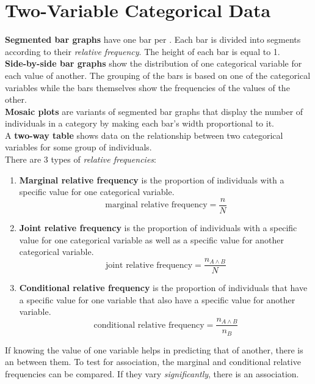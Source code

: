 \documentclass[../AP_Statistics.tex]{subfiles}
\begin{document}
	\chapter{Two-Variable Categorical Data}
		\textbf{Segmented bar graphs} have one bar per . Each bar is divided into segments according to their \emph{relative frequency}. The height of each bar is equal to 1. \\
		\textbf{Side-by-side bar graphs} show the distribution of one categorical variable for each value of another. The grouping of the bars is based on one of the categorical variables while the bars themselves show the frequencies of the values of the other. \\
		\textbf{Mosaic plots} are variants of segmented bar graphs that display the number of individuals in a category by making each bar's width proportional to it. \\
		A \textbf{two-way table} shows data on the relationship between two categorical variables for some group of individuals. \\
		There are 3 types of \emph{relative frequencies}:
		\begin{enumerate}
			\item \textbf{Marginal relative frequency} is the proportion of individuals with a specific value for one categorical variable.
				\[\text{marginal relative frequency} = \frac{n}{N}\]
			\item \textbf{Joint relative frequency} is the proportion of individuals with a specific value for one categorical variable as well as a specific value for another categorical variable.
				\[\text{joint relative frequency} = \frac{n_{A \land B}}{N}\]
			\item \textbf{Conditional relative frequency} is the proportion of individuals that have a specific value for one variable that also have a specific value for another variable.
				\[\text{conditional relative frequency} = \frac{n_{A \land B}}{n_B}\]
		\end{enumerate}
			If knowing the value of one variable helps in predicting that of another, there is an  between them. To test for association, the marginal and conditional relative frequencies can be compared. If they vary \emph{significantly}, there is an association.
\end{document}
